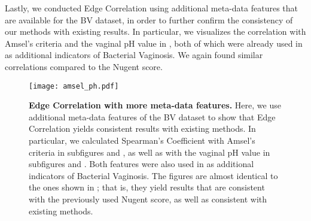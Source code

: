 Lastly, we conducted Edge Correlation using additional meta-data features that are available for the \ac{BV} dataset,
in order to further confirm the consistency of our methods with existing results.
In particular, we visualizes the correlation with Amsel's criteria \cite{Amsel1983} and the vaginal pH value
in , both of which were already used in \cite{Srinivasan2012} as additional indicators of Bacterial Vaginosis.
We again found similar correlations compared to the Nugent score.


\begin{figure}[!hpbt]
    \centering
    \texttt{[image: amsel\_ph.pdf]}
    \begin{subfigure}{0pt}
        \label{fig:amsel_ph:sub:amsel_em}
    \end{subfigure}
    \begin{subfigure}{0pt}
        \label{fig:amsel_ph:sub:amsel_ei}
    \end{subfigure}
    \begin{subfigure}{0pt}
        \label{fig:amsel_ph:sub:ph_em}
    \end{subfigure}
    \begin{subfigure}{0pt}
        \label{fig:amsel_ph:sub:ph_ei}
    \end{subfigure}
    \caption[Edge Correlation with more meta-data features]{
        \textbf{Edge Correlation with more meta-data features.}
        Here, we use additional meta-data features of the \ac{BV} dataset
        to show that Edge Correlation yields consistent results with existing methods.
        In particular, we calculated Spearman's Coefficient with Amsel's criteria \cite{Amsel1983}
        in subfigures  and ,
        as well as with the vaginal pH value
        in subfigures  and .
        Both features were also used in  as additional indicators of Bacterial Vaginosis.
        The figures are almost identical to the ones shown in ;
        that is, they yield results that are consistent with the previously used Nugent score,
        as well as consistent with existing methods.
    }
    \label{fig:amsel_ph}
\end{figure}

